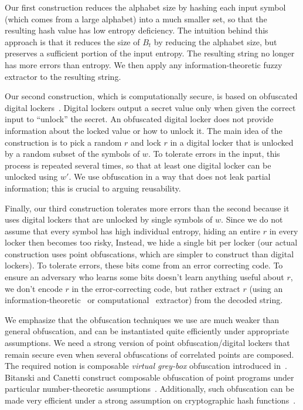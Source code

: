 \documentclass[11pt]{article}
\newcommand{\authnote}[2]{{\textcolor{red}{\textsf{#1 notes: }\textcolor{blue}{ #2}}\marginpar{\textcolor{red}{\textbf{!!!!!}}}}}
\newcommand{\authnote}[2]{}
\newcommand{\bnote}[1]{{\authnote{Ben}{#1}}}
\newcommand{\lnote}[1]{{\authnote{Leo}{#1}}}
\begin{document}
Our first construction reduces the alphabet size by hashing each input symbol (which comes from a large alphabet) into a much smaller set, so that the resulting hash value has low entropy deficiency.
The intuition behind this approach is that it reduces the size of $B_t$ by reducing the alphabet size, but preserves a sufficient portion of the input entropy.  The resulting string no longer has more errors than entropy.
 We then apply any information-theoretic fuzzy extractor to the resulting string.

Our second construction, which is computationally secure, is based on obfuscated digital lockers~\cite{canetti2008obfuscating}. Digital lockers output a secret value only when given the correct input to ``unlock'' the secret. An obfuscated digital locker does not provide information about the locked value or how to unlock it.  The main idea of the construction is to pick a random $r$ and lock $r$ in a digital locker that is unlocked by a random subset of the symbols of $w$. To tolerate errors in the input, this process is repeated several times, so that at least one digital locker can be unlocked using $w'$. We use obfuscation in a way that does not leak partial information; this is crucial to arguing reusability.

Finally, our third construction tolerates more errors than the second because it uses digital lockers that are unlocked by single symbols of $w$. Since we do not assume that every symbol has high individual entropy, hiding an entire $r$ in every locker then becomes too risky, Instead, we hide a single bit per locker (our actual construction uses point obfuscations, which are simpler to construct than digital lockers). To tolerate errors, these bits come from an error correcting code. To ensure an  adversary who learns some bits doesn't learn anything useful about $r$, we don't encode $r$ in the error-correcting code, but rather extract $r$ (using an information-theoretic~\cite{nisan1993randomness} or computational~\cite{krawczyk2010cryptographic} extractor) from the decoded string.


We emphasize that the obfuscation techniques we use are much weaker than general obfuscation, and can be instantiated quite efficiently under appropriate assumptions.
We need a strong version of point obfuscation/digital lockers that remain secure even when several obfuscations of correlated points are composed. The required notion is 
composable \emph{virtual grey-box} obfuscation introduced in~\cite{bitansky2010strong}. Bitanski and Canetti construct composable obfuscation of point programs under particular number-theoretic assumptions~\cite{bitansky2010strong}. 
Additionally, such obfuscation can be made very efficient under a strong assumption on cryptographic hash functions~\cite{canetti1997towards}.
\end{document}

